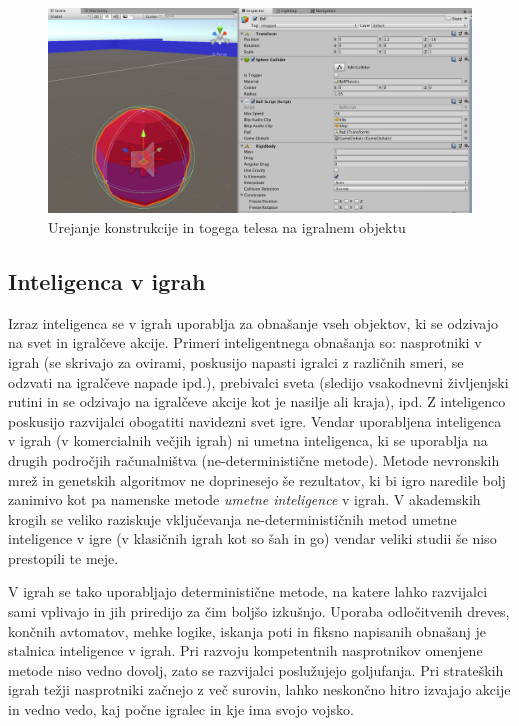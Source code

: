 \documentclass[12pt,a4paper,twoside]{book}
\begin{document}
\begin{figure}[h]
	\centering
	\includegraphics[width=15cm]{unityRigidbody}
	\caption{Urejanje konstrukcije in togega telesa na igralnem objektu}
	\label{slika:unityRigidbody}
\end{figure}

\subsection{Inteligenca v igrah}
Izraz inteligenca se v igrah uporablja za obnašanje vseh objektov, ki se odzivajo na svet in igralčeve akcije. Primeri inteligentnega obnašanja so: nasprotniki v igrah (se skrivajo za ovirami, poskusijo napasti igralci z različnih smeri, se odzvati na igralčeve napade ipd.), prebivalci sveta (sledijo vsakodnevni življenjski rutini in se odzivajo na igralčeve akcije kot je nasilje ali kraja), ipd. Z inteligenco poskusijo razvijalci obogatiti navidezni svet igre. Vendar uporabljena inteligenca v igrah (v komercialnih večjih igrah) ni umetna inteligenca, ki se uporablja na drugih področjih računalništva (ne-deterministične metode). Metode nevronskih mrež in genetskih algoritmov ne doprinesejo še rezultatov, ki bi igro naredile bolj zanimivo kot pa namenske metode \textit{umetne inteligence} v igrah. V akademskih krogih se veliko raziskuje vključevanja ne-determinističnih metod umetne inteligence v igre (v klasičnih igrah kot so šah in go) vendar veliki studii še niso prestopili te meje. 

V igrah se tako uporabljajo deterministične metode, na katere lahko razvijalci sami vplivajo in jih priredijo za čim boljšo izkušnjo. Uporaba odločitvenih dreves, končnih avtomatov, mehke logike, iskanja poti in fiksno napisanih obnašanj je stalnica inteligence v igrah. Pri razvoju kompetentnih nasprotnikov omenjene metode niso vedno dovolj, zato se razvijalci poslužujejo goljufanja. Pri strateških igrah težji nasprotniki začnejo z več surovin, lahko neskončno hitro izvajajo akcije in vedno vedo, kaj počne igralec in kje ima svojo vojsko.
\end{document}
